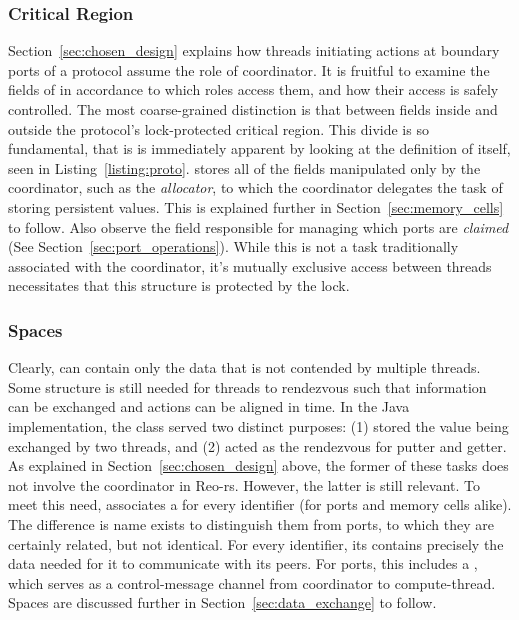 \subsubsection{Critical Region}
Section~\ref{sec:chosen_design} explains how threads initiating actions at boundary ports of a protocol assume the role of coordinator. It is fruitful to examine the fields of  in accordance to which roles access them, and how their access is safely controlled. The most coarse-grained distinction is that between fields inside and outside the protocol's lock-protected critical region. This divide is so fundamental, that is is immediately apparent by looking at the definition of  itself, seen in Listing~\ref{listing:proto}.  stores all of the fields manipulated only by the coordinator, such as the \textit{allocator}, to which the coordinator delegates the task of storing persistent values. This is explained further in Section~\ref{sec:memory_cells} to follow. Also observe the field responsible for managing which ports are \textit{claimed} (See Section~\ref{sec:port_operations}). While this is not a task traditionally associated with the coordinator, it's mutually exclusive access between threads necessitates that this structure is protected by the lock.

\subsubsection{Spaces}
Clearly,  can contain only the data that is not contended by multiple threads. Some structure is still needed for threads to rendezvous such that information can be exchanged and actions can be aligned in time. In the Java implementation, the class  served two distinct purposes: (1) stored the value being exchanged by two threads, and (2) acted as the rendezvous for putter and getter. As explained in Section~\ref{sec:chosen_design} above, the former of these tasks does not involve the coordinator in Reo-rs. However, the latter is still relevant. To meet this need,  associates a  for every identifier (for ports and memory cells alike). The difference is name exists to distinguish them from ports, to which they are certainly related, but not identical. For every identifier, its  contains precisely the data needed for it to communicate with its peers. For ports, this includes a , which serves as a control-message channel from coordinator to compute-thread. Spaces are discussed further in Section~\ref{sec:data_exchange} to follow. 

